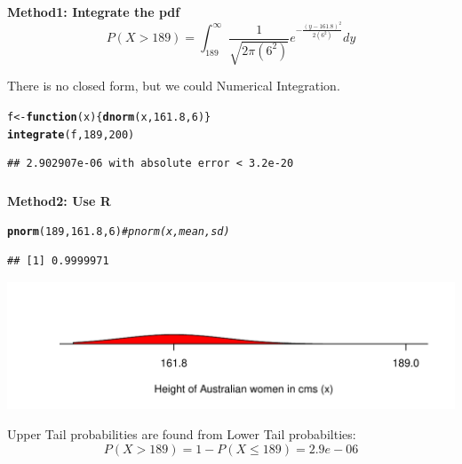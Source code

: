 \documentclass[t,xcolor=pdftex,dvipsnames,table]{beamer}\usepackage[]{graphicx}\usepackage[]{color}
\makeatletter
\def\maxwidth{ %
  \ifdim\Gin@nat@width>\linewidth
    \linewidth
  \else
    \Gin@nat@width
  \fi
}
\newcommand{\hlnum}[1]{\textcolor[rgb]{0.686,0.059,0.569}{#1}}%
\newcommand{\hlcom}[1]{\textcolor[rgb]{0.678,0.584,0.686}{\textit{#1}}}%
\newcommand{\hlstd}[1]{\textcolor[rgb]{0.345,0.345,0.345}{#1}}%
\newcommand{\hlkwa}[1]{\textcolor[rgb]{0.161,0.373,0.58}{\textbf{#1}}}%
\newcommand{\hlkwb}[1]{\textcolor[rgb]{0.69,0.353,0.396}{#1}}%
\newcommand{\hlkwc}[1]{\textcolor[rgb]{0.333,0.667,0.333}{#1}}%
\newcommand{\hlkwd}[1]{\textcolor[rgb]{0.737,0.353,0.396}{\textbf{#1}}}%
\newenvironment{kframe}{%
 \def\at@end@of@kframe{}%
 \ifinner\ifhmode%
  \def\at@end@of@kframe{\end{minipage}}%
  \begin{minipage}{\columnwidth}%
 \fi\fi%
 \def\FrameCommand##1{\hskip\@totalleftmargin \hskip-\fboxsep
 \colorbox{shadecolor}{##1}\hskip-\fboxsep
     \hskip-\linewidth \hskip-\@totalleftmargin \hskip\columnwidth}%
 \MakeFramed {\advance\hsize-\width
   \@totalleftmargin\z@ \linewidth\hsize
   \@setminipage}}%
 {\par\unskip\endMakeFramed%
 \at@end@of@kframe}
\newenvironment{knitrout}{}{} %
\makeatother
\begin{document}
\begin{frame}[fragile]\frametitle{}
{\bf Method1: Integrate the pdf} \\

\[ P(X > 189) = \int_{189}^{\infty} \frac{1}{  \sqrt{2 \pi (6^2)}}  e^{   -\frac{ (y-161.8)^2 }{2 (6^2)  } } dy \]


\vspace{1cm}
There is no closed form, but we could Numerical Integration.
\begin{knitrout}
\color{fgcolor}\begin{kframe}
\begin{alltt}
\hlstd{f} \hlkwb{<-} \hlkwa{function}\hlstd{(}\hlkwc{x}\hlstd{) \{}\hlkwd{dnorm}\hlstd{(x,}\hlnum{161.8}\hlstd{,}\hlnum{6}\hlstd{)\}}
\hlkwd{integrate}\hlstd{(f,}\hlnum{189}\hlstd{,}\hlnum{200}\hlstd{)}
\end{alltt}
\begin{verbatim}
## 2.902907e-06 with absolute error < 3.2e-20
\end{verbatim}
\end{kframe}
\end{knitrout}
\end{frame}


\begin{frame}[fragile]\frametitle{}

{\bf Method2: Use R}

\begin{knitrout}
\color{fgcolor}\begin{kframe}
\begin{alltt}
\hlkwd{pnorm}\hlstd{(}\hlnum{189}\hlstd{,}\hlnum{161.8}\hlstd{,}\hlnum{6}\hlstd{)}  \hlcom{#pnorm(x,mean,sd) }
\end{alltt}
\begin{verbatim}
## [1] 0.9999971
\end{verbatim}
\end{kframe}
\end{knitrout}

\begin{knitrout}
\color{fgcolor}
\includegraphics[width=\maxwidth]{figure/unnamed-chunk-85-1} 

\end{knitrout}

Upper Tail probabilities are found from Lower Tail probabilties:
\[ P(X > 189) = 1- P(X \leq 189) = 2.9e-06 \]

\end{frame}
\end{document}
